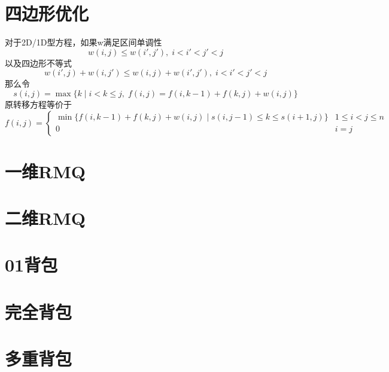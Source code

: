 \section{四边形优化}
对于2D/1D型方程，如果w满足区间单调性
\begin{displaymath}
	w(i,j)\leqslant w(i',j'),\;i<i'<j'<j
\end{displaymath}
以及四边形不等式
\begin{displaymath}
	w(i',j)+w(i,j')\leqslant w(i,j)+w(i',j'),\;i<i'<j'<j
\end{displaymath}
那么令
\begin{displaymath}
	s(i,j)=\max\{k\;|\;i<k\leqslant j,\;f(i,j)=f(i,k-1)+f(k,j)+w(i,j)\}	
\end{displaymath}
原转移方程等价于
\begin{displaymath}
	f(i,j)=
		\begin{cases}
			\min\{f(i,k-1)+f(k,j)+w(i,j)\;|\;s(i,j-1)\leqslant k\leqslant s(i+1,j)\} & 1\leqslant i<j\leqslant n \\
			0                                                                        & i=j
		\end{cases}
\end{displaymath}

\section{一维RMQ}
\section{二维RMQ}
\section{01背包}
\section{完全背包}
\section{多重背包}
